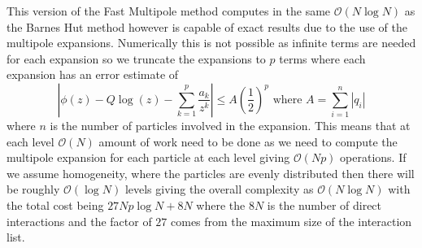 This version of the Fast Multipole method computes in the same $\mathcal{O}(N\log N)$ as the Barnes Hut method however is capable of exact results due to the use of the multipole expansions. Numerically this is not possible as infinite terms are needed for each expansion so we truncate the expansions to $p$ terms where each expansion has an error estimate of \cite{Beatson,Greengard1987ASimulations}
\begin{equation*}
    \left|\phi(z)-Q \log (z)-\sum_{k=1}^{p} \frac{a_{k}}{z^{k}}\right| \leq A\left(\frac{1}{2}\right)^{p} \text{ where } A = \sum_{i=1}^{n} |q_i|
\end{equation*}
where $n$ is the number of particles involved in the expansion. This means that at each level $\mathcal{O}(N)$ amount of work need to be done as we need to compute the multipole expansion for each particle at each level giving $\mathcal{O}(Np)$ operations. If we assume homogeneity, where the particles are evenly distributed then there will be roughly $\mathcal{O}(\log N)$ levels giving the overall complexity as $\mathcal{O}(N\log N)$ with the total cost being $27Np\log N + 8N$ where the $8N$ is the number of direct interactions and the factor of $27$ comes from the maximum size of the interaction list. 



